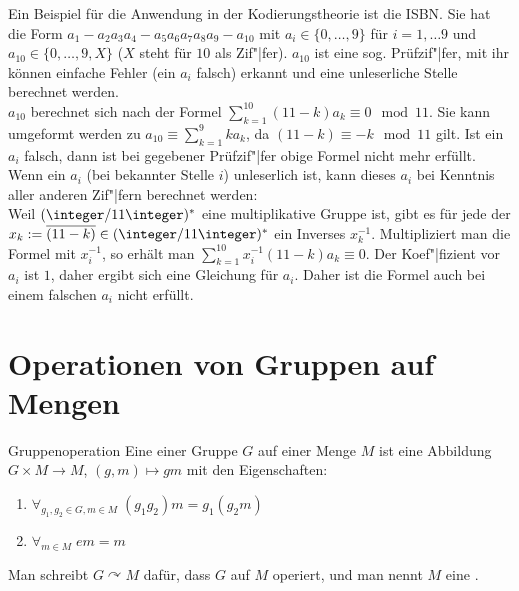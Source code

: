 \linie

\begin{Bsp}
    Ein Beispiel für die Anwendung in der Kodierungstheorie ist die ISBN.
    Sie hat die Form $a_1 - a_2 a_3 a_4 - a_5 a_6 a_7 a_8 a_9 - a_{10}$
    mit $a_i \in \{0, \dotsc, 9\}$ für $i = 1, \dotsc 9$ und
    $a_{10} \in \{0, \dotsc, 9, X\}$
    ($X$ steht für $10$ als Zif"|fer).
    $a_{10}$ ist eine sog. Prüfzif"|fer, mit ihr können einfache Fehler
    (ein $a_i$ falsch) erkannt und eine unleserliche Stelle
    berechnet werden.\\
    $a_{10}$ berechnet sich nach der Formel
    $\sum_{k=1}^{10} (11 - k) a_k \equiv 0 \mod 11$.
    Sie kann umgeformt werden zu $a_{10} \equiv \sum_{k=1}^9 k a_k$,
    da $(11 - k) \equiv -k \mod 11$ gilt.
    Ist ein $a_i$ falsch, dann ist bei gegebener Prüfzif"|fer obige
    Formel nicht mehr erfüllt.
    Wenn ein $a_i$ (bei bekannter Stelle $i$) unleserlich ist,
    kann dieses $a_i$ bei Kenntnis aller anderen Zif"|fern berechnet werden:\\
    Weil $(\integer/11\integer)^\ast$ eine multiplikative Gruppe ist,
    gibt es für jede der
    $x_k := \overline{(11 - k)} \in (\integer/11\integer)^\ast$
    ein Inverses $x_k^{-1}$.
    Multipliziert man die Formel mit $x_i^{-1}$, so erhält man
    $\sum_{k=1}^{10} x_i^{-1} (11 - k) a_k \equiv 0$.
    Der Koef"|fizient vor $a_i$ ist $1$, daher ergibt sich eine Gleichung für
    $a_i$.
    Daher ist die Formel auch bei einem falschen $a_i$ nicht erfüllt.
\end{Bsp}

\pagebreak

\section{%
    Operationen von Gruppen auf Mengen%
}

\begin{Def}{Gruppenoperation}
    Eine  einer Gruppe $G$ auf einer Menge $M$
    ist eine Abbildung $G \times M \rightarrow M$,
    $(g, m) \mapsto gm$ mit den Eigenschaften:
    \begin{enumerate}[label=(O\arabic*)]
        \item
        $\forall_{g_1, g_2 \in G, m \in M}\; (g_1 g_2) m = g_1 (g_2 m)$

        \item
        $\forall_{m \in M}\; em = m$
    \end{enumerate}
    Man schreibt $G \curvearrowright M$ dafür,
    dass $G$ auf $M$ operiert,
    und man nennt $M$ eine .
\end{Def}

